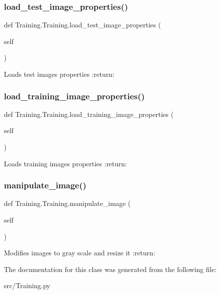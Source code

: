 \subsubsection{\texorpdfstring{load\+\_\+test\+\_\+image\+\_\+properties()}{load\_test\_image\_properties()}}
{\footnotesize\ttfamily def Training.\+Training.\+load\+\_\+test\+\_\+image\+\_\+properties (\begin{DoxyParamCaption}\item[{}]{self }\end{DoxyParamCaption})}

\begin{DoxyVerb}Loads test images properties
:return:
\end{DoxyVerb}
 \mbox{\label{class_training_1_1_training_a910d50cee577997808b934c6ef0d5a31}} 
\subsubsection{\texorpdfstring{load\+\_\+training\+\_\+image\+\_\+properties()}{load\_training\_image\_properties()}}
{\footnotesize\ttfamily def Training.\+Training.\+load\+\_\+training\+\_\+image\+\_\+properties (\begin{DoxyParamCaption}\item[{}]{self }\end{DoxyParamCaption})}

\begin{DoxyVerb}Loads training images properties
:return:
\end{DoxyVerb}
 \mbox{\label{class_training_1_1_training_a231b923ada43f82a67e09fc474b79ccf}} 
\subsubsection{\texorpdfstring{manipulate\+\_\+image()}{manipulate\_image()}}
{\footnotesize\ttfamily def Training.\+Training.\+manipulate\+\_\+image (\begin{DoxyParamCaption}\item[{}]{self }\end{DoxyParamCaption})}

\begin{DoxyVerb}Modifies images to gray scale and resize it
:return:
\end{DoxyVerb}
 

The documentation for this class was generated from the following file\+:\begin{DoxyCompactItemize}
\item 
src/Training.\+py\end{DoxyCompactItemize}
